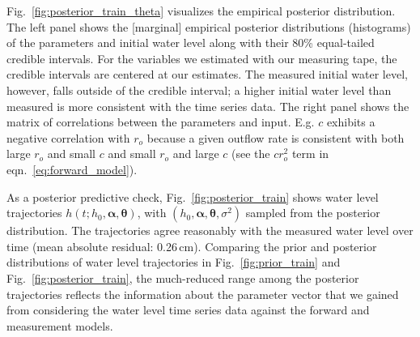 \documentclass[a4paper,fleqn]{cas-dc}
\newcommand\themodel {$h(t; h_0, \boldsymbol \alpha, \boldsymbol\theta)$\xspace}
\newcommand\thevars{h_0, \boldsymbol \alpha, \boldsymbol \theta, \sigma^2}
\begin{document}

Fig.~\ref{fig:posterior_train_theta} visualizes the empirical posterior distribution. 
The left panel shows the [marginal] empirical posterior distributions (histograms) of the parameters and initial water level along with their 80\% equal-tailed credible intervals. 
For the variables we estimated with our measuring tape, the credible intervals are centered at our estimates. 
The measured initial water level, however, falls outside of the credible interval; a higher initial water level than measured is more consistent with the time series data.
The right panel shows the matrix of correlations between the parameters and input. E.g. $c$ exhibits a negative correlation with $r_o$ because a given outflow rate is consistent with both large $r_o$ and small $c$ and small $r_o$ and large $c$ (see the $cr_o^2$ term in eqn.~\ref{eq:forward_model}).



As a posterior predictive check, Fig.~\ref{fig:posterior_train} shows water level trajectories \themodel, with $(\thevars)$ sampled from the posterior distribution. The trajectories agree reasonably with the measured water level over time (mean absolute residual: 0.26\,cm). 
Comparing the prior and posterior distributions of water level trajectories in Fig.~\ref{fig:prior_train} and Fig.~\ref{fig:posterior_train}, the much-reduced range among the posterior trajectories reflects the information about the parameter vector that we gained from considering the water level time series data against the forward and measurement models.
\end{document}
